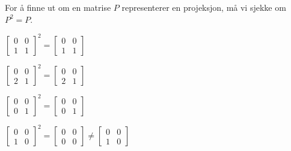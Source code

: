 \begin{losning}
For å finne ut om en matrise $P$ representerer en projeksjon, må vi
sjekke om $P^2 = P$.
\begin{punkt}
$
\begin{bmatrix}
 0 & 0\\
 1 & 1
\end{bmatrix}
^2
=
\begin{bmatrix}
 0 & 0\\
 1 & 1
\end{bmatrix}
$
\end{punkt}
\begin{punkt}
$
\begin{bmatrix}
 0 & 0\\
 2 & 1
\end{bmatrix}
^2
=
\begin{bmatrix}
 0 & 0\\
 2 & 1
\end{bmatrix}
$
\end{punkt}
\begin{punkt}
$
\begin{bmatrix}
 0 & 0\\
 0 & 1
\end{bmatrix}
^2
=
\begin{bmatrix}
 0 & 0\\
 0 & 1
\end{bmatrix}
$
\end{punkt}
\begin{punkt}
$
\begin{bmatrix}
 0 & 0\\
 1 & 0
\end{bmatrix}
^2
=
\begin{bmatrix}
 0 & 0\\
 0 & 0
\end{bmatrix}
\ne
\begin{bmatrix}
 0 & 0\\
 1 & 0
\end{bmatrix}
$
\end{punkt}
\end{losning}
